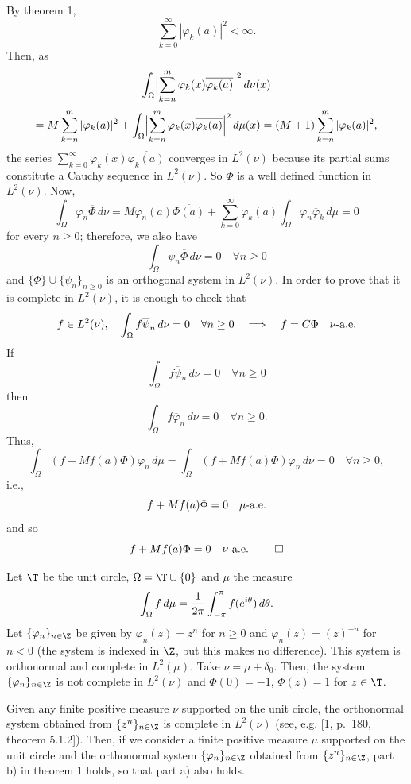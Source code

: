 \proof By theorem 1,
$$
   \sum_{k=0}^{\infty} |\varphi_k(a)|^2 < \infty.
$$
Then, as
$$
    \int_{\Omega} \Bigl|\sum_{k=n}^m
        \varphi_k(x) \overline{\varphi_k(a)}\Bigr|^2 \,d\nu(x)
$$
$$
    = M \sum_{k=n}^m |\varphi_k(a)|^2
    + \int_{\Omega} \Bigl|\sum_{k=n}^m
        \varphi_k(x) \overline{\varphi_k(a)}\Bigr|^2 \,d\mu(x)
    = (M+1) \sum_{k=n}^m |\varphi_k(a)|^2,
$$
the series $\displaystyle \sum_{k=0}^{\infty} \varphi_k(x)
\overline{\varphi_k(a)}$ converges in $L^2(\nu)$ because its partial sums
constitute a Cauchy sequence in $L^2(\nu)$. So $\Phi$ is a well defined
function in $L^2(\nu)$. Now,
$$
   \int_{\Omega} \varphi_n \overline \Phi \,d\nu =
   M \varphi_n(a) \overline {\Phi(a)} +
   \sum_{k=0}^{\infty} \varphi_k(a)
   \int_{\Omega} \varphi_n \overline \varphi_k \,d\mu = 0
$$
for every $n \geq 0$; therefore, we also have
$$
   \int_{\Omega} \psi_n \overline \Phi \,d\nu = 0 \quad \forall n \geq 0
$$
and $\{\Phi\} \cup \{\psi_n\}_{n\geq 0}$ is an orthogonal system in $L^2(\nu)$.
In order to prove that it is complete in $L^2(\nu)$, it is enough to check that
$$
   f \in L^2(\nu), \quad \int_{\Omega} f \overline\psi_n \,d\nu = 0
   \quad \forall n \geq 0 \quad \Longrightarrow\quad f = C \Phi \quad
   \nu\hbox{-a.e.}
$$
If
$$
   \int_{\Omega} f \overline\psi_n \,d\nu = 0 \quad \forall n \geq 0
$$
then
$$ 
   \int_{\Omega} f \overline\varphi_n \,d\nu = 0 \quad \forall n \geq 0.
$$
Thus,
$$
   \int_{\Omega} (f+Mf(a)\Phi) \overline\varphi_n \,d\mu =
   \int_{\Omega} (f+Mf(a)\Phi) \overline\varphi_n \,d\nu = 0
   \quad \forall n \geq 0,
$$
i.e.,
$$
   f+Mf(a)\Phi = 0 \quad \mu\hbox{-a.e.}
$$
and so
$$
   f+Mf(a)\Phi = 0 \quad \nu\hbox{-a.e.}\ \qed
$$

\medskip

 Let $\T$ be the unit circle, $\Omega = \T \cup \{0\}$
and $\mu$ the measure
$$
   \int_{\Omega} f \,d\mu
   = {1 \over 2\pi}\int_{-\pi}^{\pi} f(e^{i\theta}) \,d\theta.
$$
Let $\{\varphi_n\}_{n\in\Z}$ be given by $\varphi_n(z) = z^n$ for $n \geq 0$
and $\varphi_n(z) = ({\overline z})^{-n}$ for $n < 0$ (the system is indexed in
$\Z$, but this makes no difference). This system is orthonormal and complete in
$L^2(\mu)$. Take $\nu = \mu + \delta_0$. Then, the system
$\{\varphi_n\}_{n\in\Z}$ is not complete in $L^2(\nu)$ and $\Phi(0) = -1$,
$\Phi(z) = 1$ for $z \in \T$.

\medskip

Given any finite positive measure $\nu$ supported on the unit circle, the
orthonormal system obtained from $\{z^n\}_{n\in\Z}$ is complete in $L^2(\nu)$
(see, e.g. [1, p.~180, theorem 5.1.2]). Then, if we consider a finite positive
measure $\mu$ supported on the unit circle and the orthonormal system
$\{\varphi_n\}_{n\in\Z}$ obtained from $\{z^n\}_{n\in\Z}$, part b) in theorem
1 holds, so that part a) also holds.

